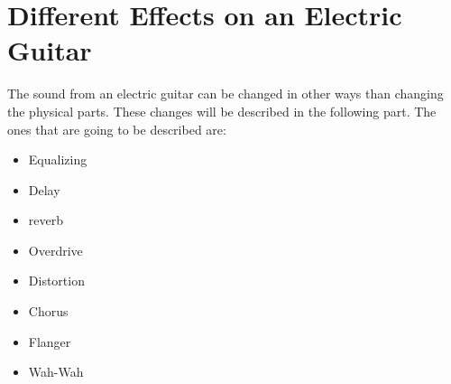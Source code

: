 

\section{Different Effects on an Electric Guitar} \label{sec:effects}

The sound from an electric guitar can be changed in other ways than changing the physical parts. These changes will be described in the following part. The ones that are going to be described are:

\begin{itemize}
 \item Equalizing
 \item Delay
 \item \gls{reverb}
 \item Overdrive
 \item Distortion
 \item Chorus
 \item Flanger
 \item Wah-Wah
\end{itemize}








